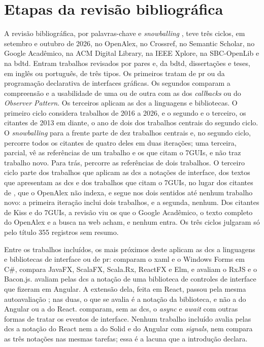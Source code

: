 \chapter{Etapas da revisão bibliográfica}
\label{apend:2}

A revisão bibliográfica, por palavras-chave e \textit{snowballing}
\cite[p.~3-4]{wohlin2014}, teve três ciclos, em setembro e outubro de
2026, no OpenAlex, no Crossref, no Semantic Scholar, no Google
Acadêmico, na ACM Digital Library, na IEEE Xplore, na SBC-OpenLib e na
\gls{bdtd}.
Entram trabalhos revisados por pares e, da \gls{bdtd}, dissertações e
teses, em inglês ou português, de três tipos.
Os primeiros tratam de \gls{pr} ou da programação declarativa de interfaces
gráficas.
Os segundos comparam a compreensão e a usabilidade de uma ou de outra com
as dos \textit{callbacks} ou do \textit{Observer Pattern}.
Os terceiros aplicam as \glspl{dc} a linguagens e bibliotecas.
O primeiro ciclo considera trabalhos de 2016 a 2026, e o segundo e o
terceiro, os citantes de 2013 em diante, o ano de dois dos trabalhos
centrais do segundo ciclo.
O \textit{snowballing} para a frente parte de dez trabalhos centrais e, no
segundo ciclo, percorre todos os citantes de quatro deles em duas
iterações; uma terceira, parcial, vê as referências de um trabalho e os que
citam o 7GUIs, e não traz trabalho novo.
Para trás, percorre as referências de dois trabalhos.
O terceiro ciclo parte dos trabalhos que aplicam as \glspl{dc} a notações
de interface, dos textos que apresentam as \glspl{dc} e dos trabalhos que
citam o 7GUIs, no lugar dos citantes de \textcite{kiss2014}, que o
OpenAlex não indexa, e segue nos dois sentidos até nenhum trabalho novo: a
primeira iteração inclui dois trabalhos, e a segunda, nenhum.
Dos citantes de Kiss e do 7GUIs, a revisão viu os que o Google Acadêmico,
o texto completo do OpenAlex e a busca na web acham, e nenhum entra.
Os três ciclos julgaram só pelo título 355 registros sem resumo.

Entre os trabalhos incluídos, os mais próximos deste aplicam as \glspl{dc}
a linguagens e bibliotecas de interface ou de \gls{pr}:
\textcite{mernik2009} comparam o \gls{xaml} e o Windows Forms em C\#,
\textcite{kiss2014} compara JavaFX, ScalaFX, Scala.Rx, ReactFX e Elm, e
\textcite{zimmerle2025} avaliam o RxJS e o Bacon.js.
\textcite{narechania2025} avaliam pelas \glspl{dc} a notação de uma
biblioteca de controles de interface que fizeram em Angular.
A extensão dela, feita em React, passou pela mesma autoavaliação
\cite{verma2026}; nas duas, o que se avalia é a notação da biblioteca, e
não a do Angular ou a do React.
\textcite{grolaux2026} comparam, sem as \glspl{dc}, o \textit{async} e
\textit{await} com outras formas de tratar os eventos de interface.
Nenhum trabalho incluído avalia pelas \glspl{dc} a notação do React nem a
do Solid e do Angular com \textit{signals}, nem compara as três notações
nas mesmas tarefas; essa é a lacuna que a introdução declara.

